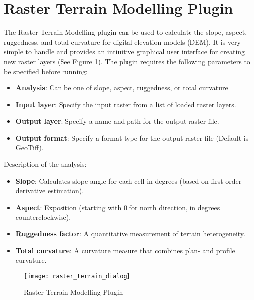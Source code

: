 
\section{Raster Terrain Modelling Plugin}\label{sec:rasterrain}


The Raster Terrain Modelling plugin can be used to calculate the slope, aspect, 
ruggedness, and total curvature for digital elevation models (DEM). It is very 
simple to handle and provides an intiuitive graphical user interface for 
creating new raster layers (See Figure \ref{fig:raster_terrain_dialog}).
The plugin requires the following parameters to be specified before running:

\begin{itemize}[label=--]
\item \textbf{Analysis}: Can be one of slope, aspect, ruggedness, or total curvature
\item \textbf{Input layer}: Specify the input raster from a list of loaded
raster layers.
\item \textbf{Output layer}: Specify a name and path for the output raster file.
\item \textbf{Output format}: Specify a format type for the output raster file 
(Default is GeoTiff).
\end{itemize}

Description of the analysis:

\begin{itemize}[label=--]
\item \textbf{Slope}: Calculates slope angle for each cell in degrees (based on first order derivative estimation).
\item \textbf{Aspect}: Exposition (starting with 0 for north direction, in degrees counterclockwise).
\item \textbf{Ruggedness factor}: A quantitative measurement of terrain heterogeneity.
\item \textbf{Total curvature}: A curvature measure that combines plan- and profile curvature.
\end{itemize}

\begin{figure}[ht]
   \centering
   \texttt{[image: raster\_terrain\_dialog]}
   \caption{Raster Terrain Modelling Plugin \nixcaption}\label{fig:raster_terrain_dialog}
\end{figure}

